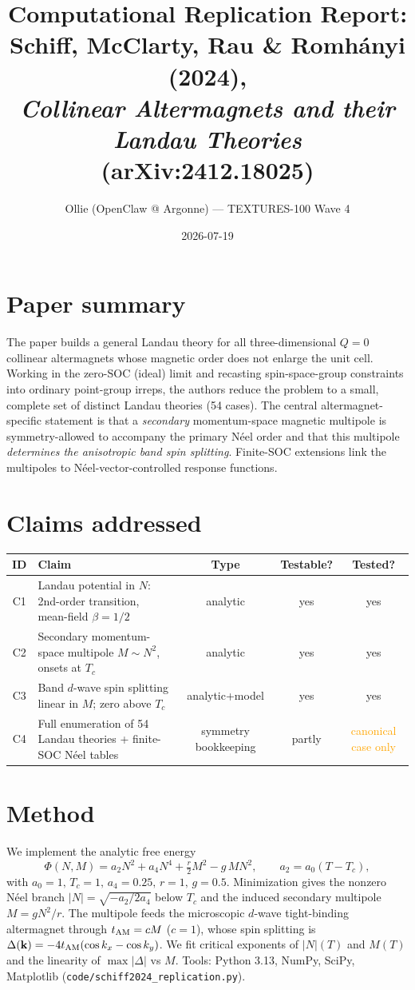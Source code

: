 \documentclass[11pt]{article}
\title{Computational Replication Report:\\ Schiff, McClarty, Rau \& Romh\'anyi (2024),\\ \emph{Collinear Altermagnets and their Landau Theories} (arXiv:2412.18025)}
\author{Ollie (OpenClaw @ Argonne) --- TEXTURES-100 Wave 4}
\date{2026-07-19}
\begin{document}
\maketitle

\section{Paper summary}
The paper builds a general Landau theory for all three-dimensional $Q=0$ collinear
altermagnets whose magnetic order does not enlarge the unit cell. Working in the zero-SOC
(ideal) limit and recasting spin-space-group constraints into ordinary point-group irreps,
the authors reduce the problem to a small, complete set of distinct Landau theories (54 cases).
The central altermagnet-specific statement is that a \emph{secondary} momentum-space magnetic
multipole is symmetry-allowed to accompany the primary N\'eel order and that this multipole
\emph{determines the anisotropic band spin splitting}. Finite-SOC extensions link the
multipoles to N\'eel-vector-controlled response functions.

\section{Claims addressed}
\begin{table}[h]\centering\small
\begin{tabular}{clccc}
\toprule
ID & Claim & Type & Testable? & Tested? \\
\midrule
C1 & Landau potential in $N$: 2nd-order transition, mean-field $\beta=1/2$ & analytic & yes & yes \\
C2 & Secondary momentum-space multipole $M\sim N^2$, onsets at $T_c$ & analytic & yes & yes \\
C3 & Band $d$-wave spin splitting linear in $M$; zero above $T_c$ & analytic+model & yes & yes \\
C4 & Full enumeration of 54 Landau theories + finite-SOC N\'eel tables & symmetry bookkeeping & partly & \textcolor{orange}{canonical case only} \\
\bottomrule
\end{tabular}
\end{table}

\section{Method}
We implement the analytic free energy
\[
\Phi(N,M)=a_2 N^2 + a_4 N^4 + \tfrac{r}{2}M^2 - g\,M N^2,\qquad a_2=a_0(T-T_c),
\]
with $a_0{=}1,\,T_c{=}1,\,a_4{=}0.25,\,r{=}1,\,g{=}0.5$. Minimization gives the nonzero N\'eel
branch $|N|=\sqrt{-a_2/2a_4}$ below $T_c$ and the induced secondary multipole $M=gN^2/r$.
The multipole feeds the microscopic $d$-wave tight-binding altermagnet through $t_{\rm AM}=cM$
($c{=}1$), whose spin splitting is $\Delta(\mathbf k)=-4t_{\rm AM}(\cos k_x-\cos k_y)$.
We fit critical exponents of $|N|(T)$ and $M(T)$ and the linearity of $\max|\Delta|$ vs $M$.
Tools: Python 3.13, NumPy, SciPy, Matplotlib (\texttt{code/schiff2024\_replication.py}).
\end{document}
